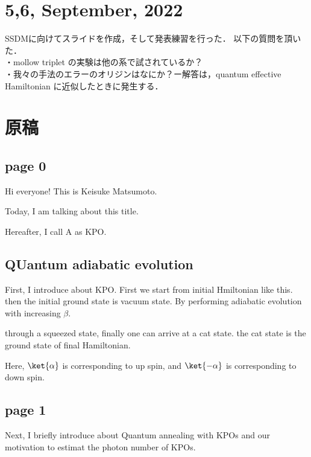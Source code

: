 \section{5,6, September, 2022}
SSDMに向けてスライドを作成，そして発表練習を行った．
以下の質問を頂いた．\\
・mollow triplet の実験は他の系で試されているか？\\
・我々の手法のエラーのオリジンはなにか？ー解答は，quantum effective Hamiltonian に近似したときに発生する．





{\LARGE{
\section{原稿}
\subsection{page 0}
Hi everyone! This is Keisuke Matsumoto.

Today, I am talking about this title.


Hereafter, I call A as KPO.

\subsection{QUantum adiabatic evolution}
First, I introduce about KPO.
First we start from initial Hmiltonian like this. then the initial ground state is vacuum state.
By performing adiabatic evolution with increasing $\beta$.

through a squeezed state, finally one can arrive at a cat state. the cat state is the ground state of final Hamiltonian.

Here, $\ket{\alpha}$ is corresponding to up spin, and $\ket{-\alpha}$ is corresponding to down spin.

\subsection{page 1}


Next, I briefly introduce about Quantum annealing with KPOs and our motivation to estimat the photon number of KPOs.

}}
